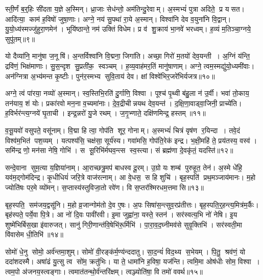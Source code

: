 स्ती॒र्णं ब॒र्॒हिः सी॑दता य॒ज्ञे अ॒स्मिन्।
ध्रा॒जाः सेध॑न्तो॒ अम॑तिन्दु॒रेवाम्।
अ॒स्मभ्यं॑ पुत्रा अदिते॒ प्र यसत।
आदि॑त्या॒ काम॑ ह॒विषो॑ जुषा॒णाः।
अग्ने॒ नय॑ सु॒पथा॑ रा॒ये अ॒स्मान्।
विश्वा॑नि देव व॒युना॑नि वि॒द्वान्।
यु॒यो॒ध्य॑स्मज्जु॑हुरा॒णमेन॑।
भूयि॑ष्ठान्ते॒ नम॑ उक्तिं विधेम।
प्र व॑ शु॒क्राय॑ भा॒नवे॑ भरध्वम्।
ह॒व्यं म॒तिञ्चा॒ग्नये॒ सुपू॑तम्॥९॥

यो दैव्या॑नि॒ मानु॑षा ज॒नूषि॑।
अ॒न्तर्विश्वा॑नि वि॒द्मना॒ जिगा॑ति।
अच्छा॒ गिरो॑ म॒तयो॑ देव॒यन्ती।
अ॒ग्निं य॑न्ति॒ द्रवि॑णं॒ भिक्ष॑माणाः।
सु॒स॒न्दृश सु॒प्रती॑क॒ स्वञ्चम्।
ह॒व्य॒वाह॑मर॒तिं मानु॑षाणाम्।
अग्ने॒ त्वम॒स्मद्यु॑यो॒ध्यमी॑वाः।
अन॑ग्नित्रा अ॒भ्य॑मन्त कृ॒ष्टीः।
पुन॑र॒स्मभ्य सुवि॒ताय॑ देव।
क्षां विश्वे॑भिर॒जरे॑भिर्यजत्र॥१०॥

अग्ने॒ त्वं पा॑रया॒ नव्यो॑ अ॒स्मान्।
स्व॒स्तिभि॒रति॑ दु॒र्गाणि॒ विश्वा।
पूश्च॑ पृ॒थ्वी ब॑हु॒ला न॑ उ॒र्वी।
भवा॑ तो॒काय॒ तन॑याय॒ शं योः।
प्रका॑रवो मन॒ना व॒च्यमा॑नाः।
दे॒व॒द्रीचीन्नयथ देव॒यन्त॑।
द॒क्षि॒णा॒वाड्वा॒जिनी॒ प्राच्ये॑ति।
ह॒विर्भर॑न्त्य॒ग्नये॑ घृ॒ताची।
इन्द्र॒न्नरो॑ यु॒जे रथम्।
ज॒गृ॒भ्णाते॒ दक्षि॑णमिन्द्र॒ हस्तम्॥११॥

व॒सू॒यवो॑ वसुपते॒ वसू॑नाम्।
वि॒द्मा हि त्वा॒ गोप॑ति शूर॒ गोनाम्।
अ॒स्मभ्यं॑ चित्रं वृष॑ण र॒यिन्दा।
तवे॒दं विश्व॑म॒भित॑ पश॒व्यम्।
यत्पश्य॑सि॒ चक्ष॑सा॒ सूर्य॑स्य।
गवा॑मसि॒ गोप॑ति॒रेक॑ इन्द्र।
भ॒क्षी॒महि॑ ते॒ प्रय॑तस्य॒ वस्व॑।
समि॑न्द्र णो॒ मन॑सा नेषि॒ गोभि॑।
स सू॒रिभि॑र्मघव॒न्त्स स्व॒स्त्या।
सं ब्रह्म॑णा दे॒वकृ॑तं॒ यदस्ति॑॥१२॥

सन्दे॒वाना सुम॒त्या य॒ज्ञिया॑नाम्।
आ॒राच्छत्रु॒मप॑ बाधस्व दू॒रम्।
उ॒ग्रो यः शम्ब॑ पुरुहूत॒ तेन॑।
अ॒स्मे धे॑हि॒ यव॑म॒द्गोम॑दिन्द्र।
कृ॒धीधियं॑ जरि॒त्रे वाज॑रत्नाम्।
आ वे॒धस॒ स हि शुचि॑।
बृह॒स्पति॑ प्रथ॒मञ्जाय॑मानः।
म॒हो ज्योति॑षः पर॒मे व्यो॑मन्।
स॒प्तास्य॑स्तुविजा॒तो रवे॑ण।
वि स॒प्तर॑श्मिरधम॒त्तमासि॥१३॥

बृह॒स्पति॒ सम॑जय॒द्वसू॑नि।
म॒हो व्र॒जान्गोम॑तो दे॒व ए॒षः।
अ॒पः सिषा॑स॒न्त्सुव॒रप्र॑तीत्तः।
बृह॒स्पति॒र्॒हन्त्य॒मित्र॑म॒र्कैः।
बृह॑स्पते॒ पर्ये॒वा पि॒त्रे।
आ नो॑ दि॒वः पावी॑रवी।
इ॒मा जुह्वा॑ना॒ यस्ते॒ स्तन॑।
सर॑स्वत्य॒भि नो॑ नेषि।
इ॒य शुष्मे॑भिर्बिस॒खा इ॑वारुजत्।
सानु॑ गिरी॒णान्त॑वि॒षेभि॑रू॒र्मिभि॑।
पा॒रा॒व॒द॒घ्नीमव॑से सुवृ॒क्तिभि॑।
सर॑स्वती॒मा वि॑वासेम धी॒तिभि॑॥१४॥\anuvakamend[दे॒व॒यानैर्दे॒वाः सुपू॑तं यजत्र॒ हस्त॒मस्ति॒ तमास्यू॒र्मिभि॒र्द्वे च॑]

सोमो॑ धे॒नु सोमो॒ अर्व॑न्तमा॒शुम्।
सोमो॑ वी॒रङ्क॑र्म॒ण्य॑न्ददातु।
सा॒द॒न्यं॑ विद॒थ्य स॒भेयम्।
पि॒तु॒ श्रव॑णं॒ यो ददा॑शदस्मै।
अषा॑ढं यु॒त्सु त्व सो॑म॒ क्रतु॑भिः।
या ते॒ धामा॑नि ह॒विषा॒ यज॑न्ति।
त्वमि॒मा ओष॑धीः सोम॒ विश्वा।
त्वम॒पो अ॑जनय॒स्त्वङ्गाः।
त्वमात॑तन्थो॒र्व॑न्तरि॑क्षम्।
त्वञ्ज्योति॑षा॒ वि तमो॑ ववर्थ॥१५॥

